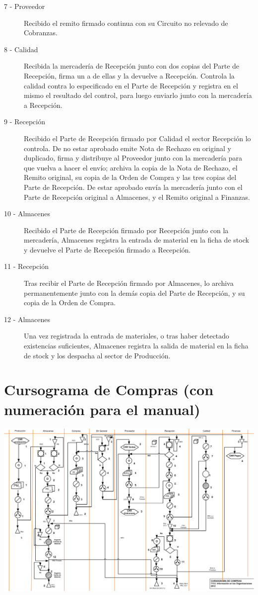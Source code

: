 \begin{description}
\item [7 - Proveedor] Recibido el remito firmado continua con su Circuito no relevado de Cobranzas.
\item [8 - Calidad] Recibida la mercadería de Recepción junto con dos copias del Parte de Recepción, firma un a de ellas y la devuelve a Recepción. Controla la calidad contra lo especificado en el Parte de Recepción y registra en el mismo el resultado del control, para luego enviarlo junto con la mercadería a Recepción.
\item [9 - Recepción] Recibido el Parte de Recepción firmado por Calidad el sector Recepción lo controla. De no estar aprobado emite Nota de Rechazo en original y duplicado, firma y distribuye al Proveedor junto con la mercadería para que vuelva a hacer el envío; archiva la copia de la Nota de Rechazo, el Remito original, su copia de la Orden de Compra y las tres copias del Parte de Recepción. De estar aprobado envía la mercadería junto con el Parte de Recepción original a Almacenes, y el Remito original a Finanzas.
\item [10 - Almacenes] Recibido el Parte de Recepción firmado por Recepción junto con la mercadería, Almacenes registra la entrada de material en la ficha de stock y devuelve el Parte de Recepción firmado a Recepción.
\item [11 - Recepción] Tras recibir el Parte de Recepción firmado por Almacenes, lo archiva permanentemente junto con la demás copia del Parte de Recepción, y su copia de la Orden de Compra.
\item [12 - Almacenes] Una vez registrada la entrada de materiales, o tras haber detectado existencias suficientes, Almacenes registra la salida de material en la ficha de stock y los despacha al sector de Producción.
\end{description}

\pagebreak
\section{Cursograma de Compras (con numeración para el manual)}
\includegraphics [scale=0.5 ,angle=90]{Empresa/Circuitos/Compras/Compras-manual.png}


